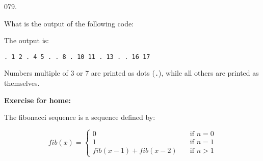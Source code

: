 \documentclass[]{book}
\newenvironment{Shaded}{}{}
\newcommand{\BuiltInTok}[1]{#1}
\newcommand{\ControlFlowTok}[1]{\textcolor[rgb]{0.00,0.44,0.13}{\textbf{#1}}}
\newcommand{\DataTypeTok}[1]{\textcolor[rgb]{0.56,0.13,0.00}{#1}}
\newcommand{\DecValTok}[1]{\textcolor[rgb]{0.25,0.63,0.44}{#1}}
\newcommand{\NormalTok}[1]{#1}
\newcommand{\StringTok}[1]{\textcolor[rgb]{0.25,0.44,0.63}{#1}}
\begin{document}
\begin{minipage}{\linewidth}\noindent
{\tiny 079.}\\
\begin{minipage}[t]{.485\linewidth}

What is the output of the following code:

\begin{framed}

\begin{Shaded}
\end{Shaded}

\end{framed}

\end{minipage}
\hfill
\begin{minipage}[t]{.485\linewidth}

The output is:

\begin{framed}

\begin{verbatim}
. 1 2 . 4 5 . . 8 . 10 11 . 13 . . 16 17 
\end{verbatim}

\end{framed}

Numbers multiple of 3 or 7 are printed as dots (\texttt{.}), while all
others are printed as themselves.

\end{minipage}
\end{minipage}

\vspace{2mm}\noindent\hrulefill{}

\textbf{Exercise for home:}

The fibonacci sequence is a sequence defined by:

\[ fib(x) =
  \begin{cases}
    0                  & \quad \text{if } n = 0 \\
    1                  & \quad \text{if } n = 1 \\
    fib(x-1)+fib(x-2)  & \quad \text{if } n > 1
  \end{cases} \]
\end{document}
